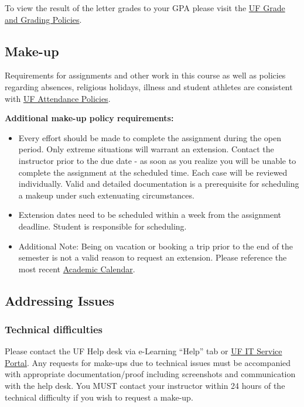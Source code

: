 \documentclass[11pt]{article}
\begin{document}
To view the result of the letter grades to your GPA please visit the \href{https://catalog.ufl.edu/UGRD/academic-regulations/grades-grading-policies}{UF Grade and Grading Policies}. \vspace{2mm}

\pagebreak

\subsection*{Make-up}
Requirements for assignments and other work in this course as well as policies regarding absences, religious holidays, illness and student athletes are consistent with \href{https://catalog.ufl.edu/UGRD/academic-regulations/attendance-policies}{UF Attendance Policies}. \vspace{2mm}

\textbf{Additional make-up policy requirements:}
\begin{itemize}
	\item Every effort should be made to complete the assignment during the open period. Only extreme situations will warrant an extension. Contact the instructor prior to the due date - as soon as you realize you will be unable to complete the assignment at the scheduled time. Each case will be reviewed individually. Valid and detailed documentation is a prerequisite for scheduling a makeup under such extenuating circumstances.
	\item Extension dates need to be scheduled within a week from the assignment deadline.  Student is responsible for scheduling.
	\item Additional Note: Being on vacation or booking a trip prior to the end of the semester is not a valid reason to request an extension.  Please reference the most recent \href{https://catalog.ufl.edu/UGRD/dates-deadlines/pdfs}{Academic Calendar}.
\end{itemize}

\subsection*{Addressing Issues}
\subsubsection*{Technical difficulties}
Please contact the UF Help desk via e-Learning ``Help'' tab or \href{https://my.it.ufl.edu/CherwellPortal/UFITServicePortal}{UF IT Service Portal}. Any requests for make-ups due to technical issues must be accompanied with appropriate documentation/proof including screenshots and communication with the help desk.  You MUST contact your instructor within 24 hours of the technical difficulty if you wish to request a make-up.
\end{document}
